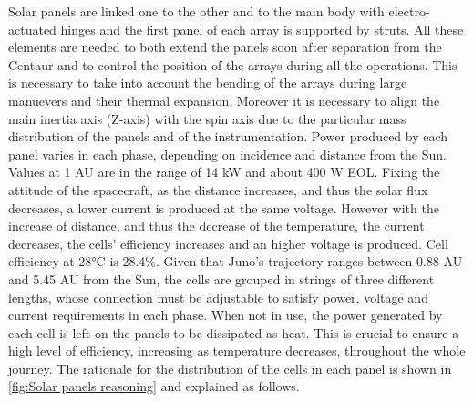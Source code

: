  Solar panels are linked one to the other and to the main body with electro-actuated hinges and the first panel of each array is supported by struts. All these elements are needed to both extend the panels soon after separation from the Centaur and to control the position of the arrays during all the operations. This is necessary to take into account the bending of the arrays during large manuevers and their thermal expansion. Moreover it is necessary to align the main inertia axis (Z-axis) with the spin axis due to the particular mass distribution of the panels and of the instrumentation. Power produced by each panel varies in each phase, depending on incidence and distance from the Sun. Values at 1 AU are in the range of 14 kW and about 400 W EOL. Fixing the attitude of the spacecraft, as the distance increases, and thus the solar flux decreases, a lower current is produced at the same voltage. However with the increase of distance, and thus the decrease of the temperature, the current decreases, the cells' efficiency increases and an higher voltage is produced. Cell efficiency at 28°C is 28.4\%.  Given that Juno's trajectory ranges between 0.88 AU and 5.45 AU from the Sun, the cells are grouped in strings of three different lengths, whose connection must be adjustable to satisfy power, voltage and current requirements in each phase. When not in use, the power generated by each cell is left on the panels to be dissipated as heat.\cite{solar_panels_coef} This is crucial to ensure a high level of efficiency, increasing as temperature decreases, throughout the whole journey. The rationale for the distribution of the cells in each panel is shown in \autoref{fig:Solar panels reasoning} and explained as follows. 


